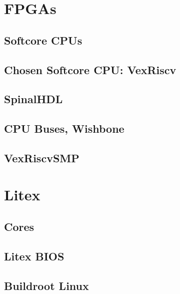 \section{FPGAs}
\subsection{Softcore CPUs}

\subsection{Chosen Softcore CPU: VexRiscv}

\subsection{SpinalHDL}

\subsection{CPU Buses, Wishbone}

\subsection{VexRiscvSMP}

\section{Litex}

\subsection{Cores}

\subsection{Litex BIOS}

\subsection{Buildroot Linux}
\raggedbottom
